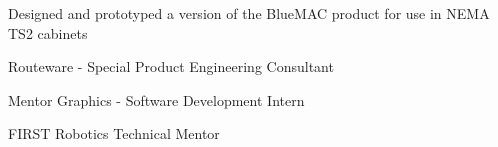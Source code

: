 \documentclass[letterpaper]{deedy-resume} %
\begin{document}
\begin{minipage}[t]{0.66\textwidth}
\begin{tightitemize}
\item Designed and prototyped a version of the BlueMAC product for use in NEMA TS2 cabinets
\end{tightitemize}
\vspace{\topsep} %

\begin{tightitemize}
\item Routeware - Special Product Engineering Consultant
\item Mentor Graphics - Software Development Intern
\item FIRST Robotics Technical Mentor

\end{tightitemize}

\end{minipage} %








\end{document}
